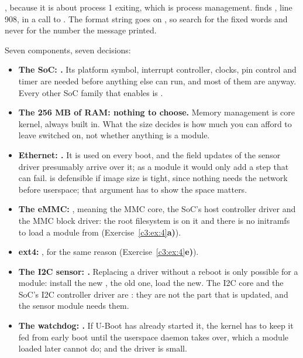  , because it is about process 1 exiting, which is process management.
 finds , line 908, in a call to
. The format string goes on , so search for the fixed words and
never for the number the message printed.


 Seven components, seven decisions:
\begin{itemize}
  \item \textbf{The SoC: .} Its platform symbol, interrupt controller, clocks, pin control
    and timer are needed before anything else can run, and most of them are  anyway.
    Every other SoC family that  enables is .
  \item \textbf{The 256 MB of RAM: nothing to choose.} Memory management is core kernel, always
    built in. What the size decides is how much you can afford to leave switched on, not whether
    anything is a module.
  \item \textbf{Ethernet: .} It is used on every boot, and the field updates of the sensor
    driver presumably arrive over it; as a module it would only add a step that can fail. 
    is defensible if image size is tight, since nothing needs the network before userspace; that
    argument has to show the space matters.
  \item \textbf{The eMMC: }, meaning the MMC core, the SoC's host controller driver and the
    MMC block driver: the root filesystem is on it and there is no initramfs to load a module from
    (Exercise~\ref{c3:ex:4}\textbf{a)}).
  \item \textbf{ext4: }, for the same reason (Exercise~\ref{c3:ex:4}\textbf{e)}).
  \item \textbf{The I2C sensor: .} Replacing a driver without a reboot is only possible
    for a module: install the new ,  the old one, load the new. The I2C core
    and the SoC's I2C controller driver are : they are not the part that is updated, and
    the sensor module needs them.
  \item \textbf{The watchdog: .} If U-Boot has already started it, the kernel has to keep
    it fed from early boot until the userspace daemon takes over, which a module loaded later
    cannot do; and the driver is small.
\end{itemize}

